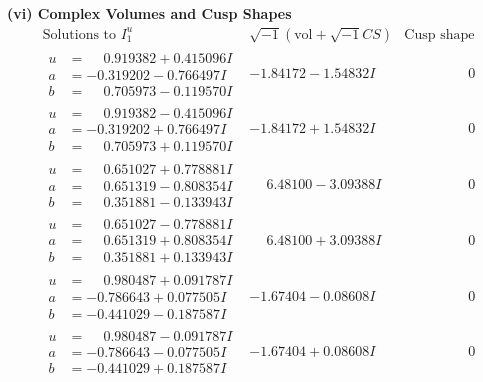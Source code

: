 \documentclass[1p]{elsarticle_modified}
\theoremstyle{definition}
\newcommand{\I}{\sqrt{-1}}
\begin{document}
\newpage\flushleft \textbf{(vi) Complex Volumes and Cusp Shapes}
$$\begin{array}{c|c|c}  
\text{Solutions to }I^u_{1}& \I (\text{vol} + \sqrt{-1}CS) & \text{Cusp shape}\\
 \hline 
\begin{aligned}
u &= \phantom{-}0.919382 + 0.415096 I \\
a &= -0.319202 - 0.766497 I \\
b &= \phantom{-}0.705973 - 0.119570 I\end{aligned}
 & -1.84172 - 1.54832 I & \phantom{-0.000000 } 0 \\ \hline\begin{aligned}
u &= \phantom{-}0.919382 - 0.415096 I \\
a &= -0.319202 + 0.766497 I \\
b &= \phantom{-}0.705973 + 0.119570 I\end{aligned}
 & -1.84172 + 1.54832 I & \phantom{-0.000000 } 0 \\ \hline\begin{aligned}
u &= \phantom{-}0.651027 + 0.778881 I \\
a &= \phantom{-}0.651319 - 0.808354 I \\
b &= \phantom{-}0.351881 - 0.133943 I\end{aligned}
 & \phantom{-}6.48100 - 3.09388 I & \phantom{-0.000000 } 0 \\ \hline\begin{aligned}
u &= \phantom{-}0.651027 - 0.778881 I \\
a &= \phantom{-}0.651319 + 0.808354 I \\
b &= \phantom{-}0.351881 + 0.133943 I\end{aligned}
 & \phantom{-}6.48100 + 3.09388 I & \phantom{-0.000000 } 0 \\ \hline\begin{aligned}
u &= \phantom{-}0.980487 + 0.091787 I \\
a &= -0.786643 + 0.077505 I \\
b &= -0.441029 - 0.187587 I\end{aligned}
 & -1.67404 - 0.08608 I & \phantom{-0.000000 } 0 \\ \hline\begin{aligned}
u &= \phantom{-}0.980487 - 0.091787 I \\
a &= -0.786643 - 0.077505 I \\
b &= -0.441029 + 0.187587 I\end{aligned}
 & -1.67404 + 0.08608 I & \phantom{-0.000000 } 0 \\ \hline\begin{aligned}

\end{aligned}
\end{array}$$
\end{document}
